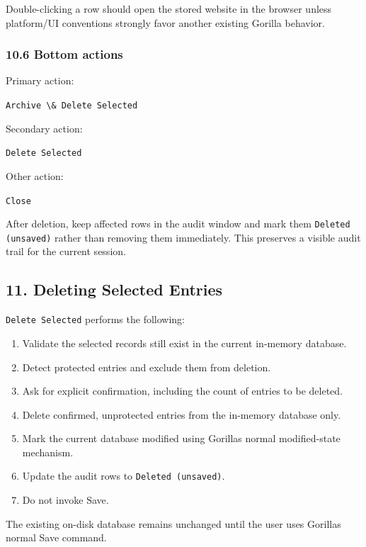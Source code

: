 \documentclass[
  letterpaper,
]{article}
\newcommand{\passthrough}[1]{#1}
\providecommand{\tightlist}{%
  \setlength{\itemsep}{0pt}\setlength{\parskip}{0pt}}
\begin{document}
Double-clicking a row should open the stored website in the browser unless platform/UI conventions strongly favor
another existing Gorilla behavior.

\subsubsection{10.6 Bottom actions}\label{106-bottom-actions}

Primary action:

\passthrough{\lstinline!Archive \& Delete Selected!}

Secondary action:

\passthrough{\lstinline!Delete Selected!}

Other action:

\passthrough{\lstinline!Close!}

After deletion, keep affected rows in the audit window and mark them \passthrough{\lstinline!Deleted (unsaved)!} rather
than removing them immediately. This preserves a visible audit trail for the current session.

\subsection{11. Deleting Selected Entries}\label{11-deleting-selected-entries}

\passthrough{\lstinline!Delete Selected!} performs the following:

\begin{enumerate}
\def\labelenumi{\arabic{enumi}.}
\tightlist
\item
  Validate the selected records still exist in the current in-memory database.
\item
  Detect protected entries and exclude them from deletion.
\item
  Ask for explicit confirmation, including the count of entries to be deleted.
\item
  Delete confirmed, unprotected entries from the in-memory database only.
\item
  Mark the current database modified using Gorilla\textquotesingle s normal modified-state mechanism.
\item
  Update the audit rows to \passthrough{\lstinline!Deleted (unsaved)!}.
\item
  Do not invoke Save.
\end{enumerate}

The existing on-disk database remains unchanged until the user uses Gorilla\textquotesingle s normal Save command.
\end{document}
